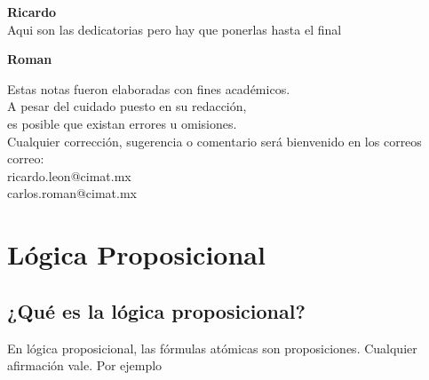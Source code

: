 \documentclass[12pt,a4paper]{book}
\begin{document}
        
    
    \thispagestyle{empty}
    

    \begin{flushright}
      \thispagestyle{empty}

        \textbf{Ricardo}\\[0.3cm]
        
        Aqui son las dedicatorias pero hay que ponerlas hasta el final

        \textbf{Roman}
    \end{flushright}


    \cleardoublepage
    \thispagestyle{empty}

    \begin{mdframed}[style=mdgreenbox]
        \begin{center}
        \small
        Estas notas fueron elaboradas con fines académicos.\\
        A pesar del cuidado puesto en su redacción,\\
        es posible que existan errores u omisiones.\\[0.3cm]

        Cualquier corrección, sugerencia o comentario será bienvenido
        en los correos correo: \\[0.3cm]

        ricardo.leon@cimat.mx\\
        carlos.roman@cimat.mx
        \end{center}
    \end{mdframed}

    
    \setcounter{page}{1}
    \tableofcontents

    \chapter{Lógica Proposicional}

    \section{¿Qué es la lógica proposicional?}

    En lógica proposicional, las fórmulas atómicas son proposiciones. Cualquier afirmación vale. Por ejemplo
\end{document}
